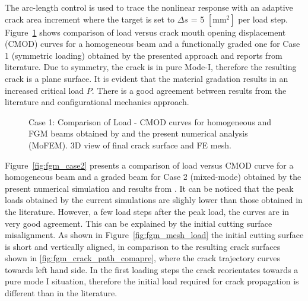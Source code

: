 \documentclass[onecolumn]{svjour3}
\begin{document}
The arc-length control is used to trace the nonlinear response with an adaptive crack area increment where the target is set to $\Delta s$ = 5 $[\mathrm{mm}^2]$ per load step. Figure~\ref{fig:fgm_case1} shows comparison of load versus crack mouth opening displacement (CMOD) curves for a homogeneous beam and a functionally graded one for Case 1 (symmetric loading) obtained by the presented approach and reports from literature. Due to symmetry, the crack is in pure Mode-I, therefore the resulting crack is a plane surface. It is evident that the material gradation results in an increased critical load $P$. There is a good agreement between results from the literature and configurational mechanics approach. 
% 
% 
\begin{figure}
	\centering
	\caption{Case 1: Comparison of Load - CMOD curves for homogeneous and FGM beams obtained by \citep{kim2004simulation} and the present numerical analysis (MoFEM). 3D view of final crack surface and FE mesh.}
	\label{fig:fgm_case1}
\end{figure}
% 
% 
Figure~\ref{fig:fgm_case2} presents a comparison of load versus CMOD curve for a homogeneous beam and a graded beam for Case 2 (mixed-mode) obtained by the present numerical simulation and results from \citep{kim2004simulation}. It can be noticed that the peak loads obtained by the current simulations are slighly lower than those obtained in the literature. However, a few load steps after the peak load, the curves are in very good agreement. This can be explained by the initial cutting surface misalignment. As shown in Figure~\ref{fig:fgm_mesh_load} the initial cutting surface is short and vertically aligned, in comparison to the resulting crack surfaces shown in \ref{fig:fgm_crack_path_comapre}, where the crack trajectory curves towards left hand side. In the first loading steps the crack reorientates towards a pure mode I situation, therefore the initial load required for crack propagation is different than in the literature.
\end{document}
